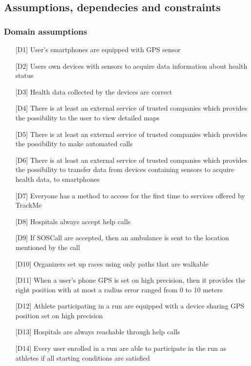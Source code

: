 \subsection{Assumptions, dependecies and constraints}

\subsubsection{Domain assumptions}
\begin{itemize}
\item[{[D1]}] User's smartphones are equipped with GPS sensor
\item[{[D2]}] Users own devices with sensors to acquire data information about health status
\item[{[D3]}] Health data collected by the devices are correct
\item[{[D4]}] There is at least an external service of trusted companies which provides the possibility to the user to view detailed maps
\item[{[D5]}] There is at least an external service of trusted companies which provides the possibility to make automated calls
\item[{[D6]}] There is at least an external service of trusted companies which provides the possibility to transfer data from devices containing sensors to acquire health data, to smartphones
\item[{[D7]}] Everyone has a method to access for the first time to services offered by TrackMe
\item[{[D8]}] Hospitals always accept help calls
\item[{[D9]}] If SOSCall are accepted, then an ambulance is sent to the location mentioned by the call
\item[{[D10]}] Organizers set up races using only paths that are walkable
\item[{[D11]}] When a user's phone GPS is set on high precision, then it provides the right position with at most a radius error ranged from 0 to 10 meters
\item[{[D12]}] Athlete participating in a run are equipped with a device sharing GPS position set on high precision
\item[{[D13]}] Hospitals are always reachable through help calls
\item[{[D14]}] Every user enrolled in a run are able to participate in the run as athletes if all starting conditions are satisfied
\end{itemize}
